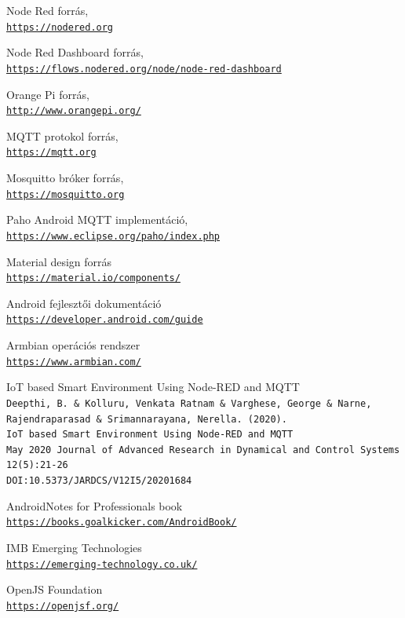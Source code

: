 \documentclass[]{thesis-ekf}
\theoremstyle{definition}
\theoremstyle{remark}
\begin{document}
\begin{thebibliography}{2}
Node Red forrás,
\\\texttt{\url{https://nodered.org}}

Node Red Dashboard forrás,
\\\texttt{\url{https://flows.nodered.org/node/node-red-dashboard}}

Orange Pi forrás,
\\\texttt{\url{http://www.orangepi.org/}}

MQTT protokol forrás,
\\\texttt{\url{https://mqtt.org}}

Mosquitto bróker forrás,
\\\texttt{\url{https://mosquitto.org}}

Paho Android MQTT implementáció,
\\\texttt{\url{https://www.eclipse.org/paho/index.php}}

Material design forrás
\\\texttt{\url{https://material.io/components/}}

Android fejlesztői dokumentáció
\\\texttt{\url{https://developer.android.com/guide}}

Armbian operációs rendszer
\\\texttt{\url{https://www.armbian.com/}}

IoT based Smart Environment Using Node-RED and MQTT
\\\texttt{Deepthi, B. \& Kolluru, Venkata Ratnam \& Varghese, George \& Narne, Rajendraparasad \& Srimannarayana, Nerella. (2020).}
\\\texttt{IoT based Smart Environment Using Node-RED and MQTT}
\\\texttt{May 2020 Journal of Advanced Research in Dynamical and Control Systems 12(5):21-26}
\\\texttt{DOI:10.5373/JARDCS/V12I5/20201684}

Android\texttrademark Notes for Professionals book
\\\texttt{\url{https://books.goalkicker.com/AndroidBook/}}

IMB Emerging Technologies
\\\texttt{\url{https://emerging-technology.co.uk/}}

OpenJS Foundation
\\\texttt{\url{https://openjsf.org/}}


\end{thebibliography}
\end{document}
